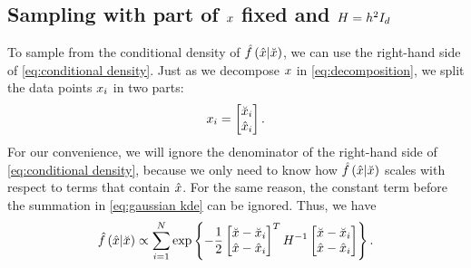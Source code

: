 \subsection{Sampling with part of $x$ fixed and $H=h^2I_{d}$}
\label{sec:sampling conditional simple}

To sample from the conditional density of $\hat{f}\left(  \hat{x} | \breve{x}  \right)$, we can use the right-hand side of \cref{eq:conditional density}.
Just as we decompose $x$ in \cref{eq:decomposition}, we split the data points $x_{i}$ in two parts:
\begin{equation}
	\label{eq:decomposition data}
	x_{i} = \begin{bmatrix}
		\breve{x}_{i} \\ \hat{x}_{i}
	\end{bmatrix}.
\end{equation}
For our convenience, we will ignore the denominator of the right-hand side of \cref{eq:conditional density}, because we only need to know how $\hat{f}\left(  \hat{x} | \breve{x}  \right)$ scales with respect to terms that contain $\hat{x}$.
For the same reason, the constant term before the summation in \cref{eq:gaussian kde} can be ignored.
Thus, we have
\begin{equation}
	\label{eq:conditional proportional}
	\hat{f}\left(  \hat{x} | \breve{x}  \right)
	\propto \sum_{i=1}^{N} 
	\exp\left\{ 
		-\frac{1}{2} 
		\begin{bmatrix}
			\breve{x} - \breve{x}_{i} \\ 
			\hat{x} - \hat{x}_{i}
		\end{bmatrix}^T 
		H^{-1}
		\begin{bmatrix}
			\breve{x} - \breve{x}_{i} \\ 
			\hat{x} - \hat{x}_{i}
		\end{bmatrix}
	 \right\}.
\end{equation}

